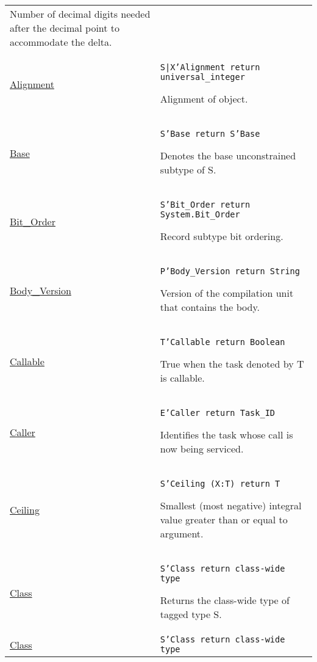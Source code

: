 \documentclass[english]{article}
\begin{document}
\begin{scriptsize}
\begin{multicols*}{3}
\begin{tabular}{@{}p{2cm}p{6.5cm}}
   Number of decimal digits needed after the decimal point to accommodate the delta.\\

   \href{http://www.ada-auth.org/standards/22rm/html/RM-K-2.html}{Alignment} & \texttt{S|X'Alignment return universal\_integer}

   Alignment of object.\\

   \href{http://www.ada-auth.org/standards/22rm/html/RM-K-2.html}{Base} & \texttt{S'Base return S'Base}

   Denotes the base unconstrained subtype of S.\\

   \href{http://www.ada-auth.org/standards/22rm/html/RM-K-2.html}{Bit\_Order} & \texttt{S'Bit\_Order return System.Bit\_Order}

   Record subtype bit ordering.\\

   \href{http://www.ada-auth.org/standards/22rm/html/RM-K-2.html}{Body\_Version} & \texttt{P'Body\_Version return String}

   Version of the compilation unit that contains the body.\\

   \href{http://www.ada-auth.org/standards/22rm/html/RM-K-2.html}{Callable} & \texttt{T'Callable return Boolean}

   True when the task denoted by T is callable.\\

   \href{http://www.ada-auth.org/standards/22rm/html/RM-K-2.html}{Caller} & \texttt{E'Caller return Task\_ID}

   Identifies the task whose call is now being serviced.\\

   \href{http://www.ada-auth.org/standards/22rm/html/RM-K-2.html}{Ceiling} & \texttt{S'Ceiling (X:T) return T}

   Smallest (most negative) integral value greater than or equal to argument.\\

   \href{http://www.ada-auth.org/standards/22rm/html/RM-K-2.html}{Class} & \texttt{S'Class return class-wide type}

   Returns the class-wide type of tagged type S.\\

   \href{http://www.ada-auth.org/standards/22rm/html/RM-K-2.html}{Class} & \texttt{S'Class return class-wide type}


\end{tabular}
\end{multicols*}
\end{scriptsize}
\end{document}
